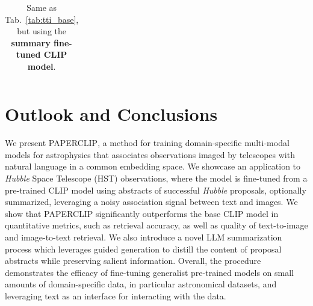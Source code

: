 \documentclass{article} %
\newcommand{\hubble}{\emph{Hubble}\xspace}
\begin{document}
\begin{table}[h!]
\begin{tabular}{m{2.7cm} p{2.9cm} p{2.9cm} p{2.9cm}}
         \bottomrule
     \end{tabular}
     \caption{Same as Tab.~\ref{tab:tti_base}, but using the \textbf{\textcolor{deepred}{summary fine-tuned CLIP model}}.}
     \label{tab:tti}
   \end{table}
   

   
   \section{Outlook and Conclusions}
   \label{sec:conclusion}
   
   We present \textsc{PAPERCLIP}, a method for training domain-specific multi-modal models for astrophysics that associates observations imaged by telescopes with natural language in a common embedding space.
   We showcase an application to \hubble Space Telescope (HST) observations, where the model is fine-tuned from a pre-trained CLIP model using abstracts of successful \hubble proposals, optionally summarized, leveraging a noisy association signal between text and images.
   We show that \textsc{PAPERCLIP} significantly outperforms the base CLIP model in quantitative metrics, such as retrieval accuracy, as well as quality of text-to-image and image-to-text retrieval.
   We also introduce a novel LLM summarization process which leverages guided generation to distill the content of proposal abstracts while preserving salient information. 
   Overall, the procedure demonstrates the efficacy of fine-tuning generalist pre-trained models on small amounts of domain-specific data, in particular astronomical datasets, and leveraging text as an interface for interacting with the data.
   
\end{document}
